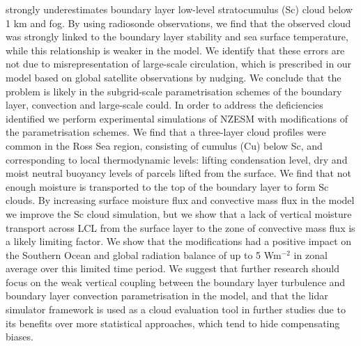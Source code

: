 strongly underestimates boundary layer low-level stratocumulus (Sc) cloud below
1 km and fog. By using radiosonde observations, we find that the observed cloud was strongly linked to the boundary layer stability and sea surface temperature, while this relationship is weaker in the
model. We identify that these errors are not due to misrepresentation of
large-scale circulation, which is prescribed in our model based on global
satellite observations by nudging. We conclude that the problem is likely in
the subgrid-scale parametrisation schemes of the boundary layer, convection
and large-scale could. In order to address the deficiencies identified we
perform experimental simulations of NZESM with modifications of the
parametrisation schemes. We find that a three-layer cloud profiles were common
in the Ross Sea region, consisting of cumulus (Cu) below Sc, and
corresponding to local thermodynamic levels: lifting condensation level,
dry and moist neutral buoyancy levels of parcels lifted from the surface.
We find that not enough moisture is transported to the top of the boundary
layer to form Sc clouds. By increasing surface moisture flux and convective mass flux in the model we improve the Sc cloud simulation, but we show that a lack of vertical moisture transport across LCL from the surface layer to the zone of convective mass flux is a likely limiting factor. We show that the modifications had a positive impact on the Southern Ocean and global radiation balance of up to 5 Wm$^{-2}$ in zonal average over this limited time period. We suggest that
further research should focus on the weak vertical coupling between the boundary
layer turbulence and boundary layer convection parametrisation in the model, and that
the lidar simulator framework is used as a cloud evaluation tool in further studies
due to its benefits over more statistical approaches, which tend to hide
compensating biases. 
